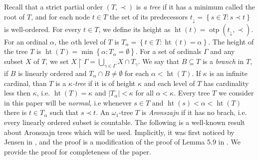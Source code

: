 \documentclass{amsart}
\theoremstyle{plain}
\theoremstyle{definition}
\numberwithin{equation}{section}
\renewcommand{\a}{\alpha}
\newcommand{\g}{\gamma}
\renewcommand{\k}{\kappa}
\renewcommand{\o}{\omega}
\newcommand{\ps}{\emptyset}
\newcommand{\rest}{\upharpoonright}
\newcommand{\sst}{\subseteq}
\newcommand{\set}[1]{\left\{#1\right\}}
\newcommand{\abs}[1]{\left\vert#1\right\vert}
\newcommand{\otp}{\operatorname{otp}}
\newcommand{\h}{\operatorname{ht}}
\begin{document}
Recall that a strict partial order $(T,\prec)$ is \emph{a tree} if it has a minimum called the root of $T$, and for each node $t\in T$ the set of its predecessors $t_{\downarrow}=\set{s\in T: s\prec t}$ is well-ordered.
For every $t\in T$, we define its height as $\h(t)=\otp(t_{\downarrow},\prec)$.
For an ordinal $\a$, the $\a$th level of $T$ is $T_{\a}=\set{t\in T:\h(t)=\a}$.
The height of the tree $T$ is $\h(T)=\min\set{\a:T_{\a}=\ps}$.
For a set of ordinals $\Gamma$ and any subset $X$ of $T$, we set $X\rest\Gamma=\bigcup_{\g\in \Gamma}X\cap T_{\g}$.
We say that $B\sst T$ is a \emph{branch} in $T$, if $B$ is linearly ordered and $T_{\a}\cap B\neq\ps$ for each $\a<\h(T)$.
If $\k$ is an infinite cardinal, than $T$ is a \emph{$\k$-tree} if it is of height $\k$ and each level of $T$ has cardinality less then $\k$, i.e. $\h(T)=\k$ and $\abs{T_{\a}}<\k$ for all $\a<\k$.
Every tree $T$ we consider in this paper will be \emph{normal}, i.e whenever $s\in T$ and $\h(s)<\a<\h(T)$ there is $t\in T_{\a}$ such that $s\prec t$.
An $\o_1$-tree $T$ is \emph{Aronszajn} if it has no brach, i.e. every linearly ordered subset is countable.
The following is a well-known result about Aronszajn trees which will be used.
Implicitly, it was first noticed by Jensen in \cite{devlin}, and the proof is a modification of the proof of Lemma 5.9 in \cite{handbook}.
We provide the proof for completeness of the paper.
\end{document}

